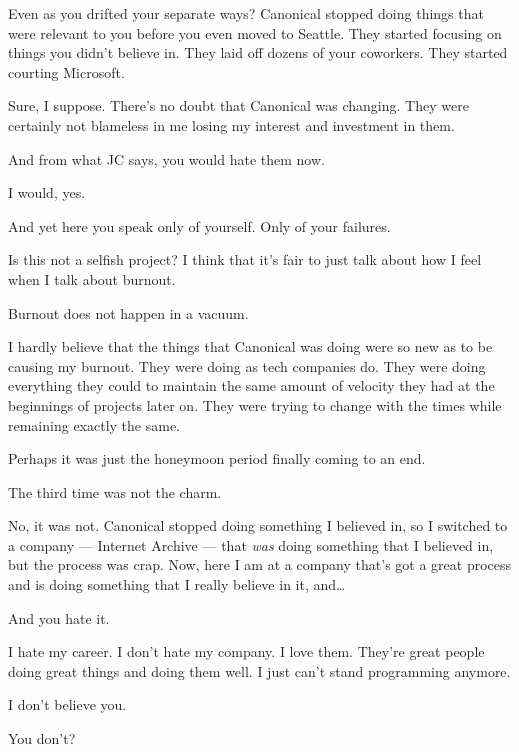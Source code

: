 \begin{paracol}{2}
\begin{leftcolumn}
\begin{ally}
Even as you drifted your separate ways? Canonical stopped doing things that were relevant to you before you even moved to Seattle. They started focusing on things you didn't believe in. They laid off dozens of your coworkers. They started courting Microsoft.
\end{ally}
Sure, I suppose. There's no doubt that Canonical was changing. They were certainly not blameless in me losing my interest and investment in them.

\begin{ally}
And from what JC says, you would hate them now.
\end{ally}
I would, yes.

\begin{ally}
And yet here you speak only of yourself. Only of your failures.
\end{ally}
Is this not a selfish project? I think that it's fair to just talk about how I feel when I talk about burnout.

\begin{ally}
Burnout does not happen in a vacuum.
\end{ally}
I hardly believe that the things that Canonical was doing were so new as to be causing my burnout. They were doing as tech companies do. They were doing everything they could to maintain the same amount of velocity they had at the beginnings of projects later on. They were trying to change with the times while remaining exactly the same.

Perhaps it was just the honeymoon period finally coming to an end.

\newpage

\begin{ally}
The third time was not the charm.
\end{ally}
No, it was not. Canonical stopped doing something I believed in, so I switched to a company --- Internet Archive --- that \emph{was} doing something that I believed in, but the process was crap. Now, here I am at a company that's got a great process and is doing something that I really believe in it, and\ldots{}

\begin{ally}
And you hate it.
\end{ally}
I hate my career. I don't hate my company. I love them. They're great people doing great things and doing them well. I just can't stand programming anymore.

\begin{ally}
I don't believe you.
\end{ally}
You don't?


\end{leftcolumn}
\end{paracol}

